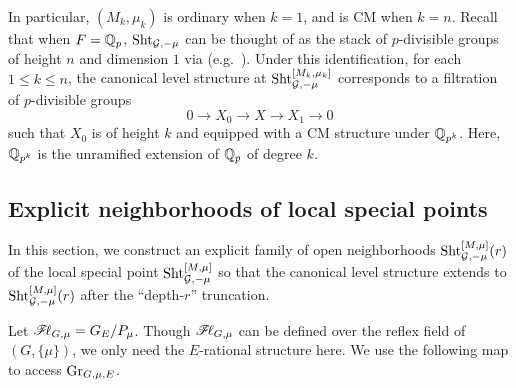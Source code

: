 \documentclass[12pt,reqno]{amsart}
\begin{document}
In particular, $(M_k, \mu_k)$ is ordinary when $k = 1$, and is CM when $k = n$. Recall that when $F = \mathbb{Q}_p$, ${\operatorname{Sht}}_{{\mathcal{G}}, -\mu}$ can be thought of as the stack of $p$-divisible groups of height $n$ and dimension $1$ via \cite{SW13} (e.g.\ \cite[Theorem 24.2.5]{SW20}). Under this identification, for each $1 \leq k \leq n$, the canonical level structure at 
$
    {\operatorname{Sht}}_{{\mathcal{G}}, -\mu}^{[M_k, \mu_k]}
$
corresponds to a filtration of $p$-divisible groups
\[
    0 \to X_0 \to X \to X_1 \to 0
\]
such that $X_0$ is of height $k$ and equipped with a CM structure under $\mathbb{Q}_{p^k}$. Here, $\mathbb{Q}_{p^k}$ is the unramified extension of $\mathbb{Q}_p$ of degree $k$. 

\subsection{Explicit neighborhoods of local special points}

In this section, we construct an explicit family of open neighborhoods ${\operatorname{Sht}}_{{\mathcal{G}}, -\mu}^{[M, \mu]}(r)$ of the local special point ${\operatorname{Sht}}_{{\mathcal{G}}, -\mu}^{[M, \mu]}$ so that the canonical level structure extends to ${\operatorname{Sht}}_{{\mathcal{G}}, -\mu}^{[M, \mu]}(r)$ after the ``depth-$r$'' truncation. 

Let ${\mathscr{F}\!\ell}_{G, \mu} = G_E / P_\mu$. Though ${\mathscr{F}\!\ell}_{G, \mu}$ can be defined over the reflex field of $(G, \{ \mu \})$, we only need the $E$-rational structure here. We use the following map to access ${\operatorname{Gr}}_{G, \mu, E}$. 
\end{document}
